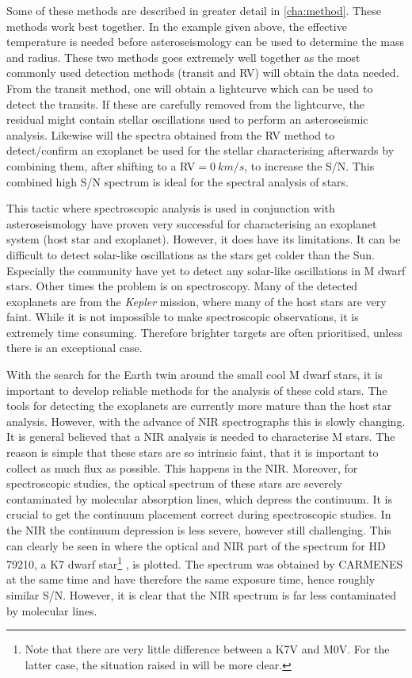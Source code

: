 Some of these methods are described in greater detail in \cref{cha:method}. These methods work best
together. In the example given above, the effective temperature is needed before asteroseismology
can be used to determine the mass and radius. These two methods goes extremely well together as the
most commonly used detection methods (transit and RV) will obtain the data needed. From the transit
method, one will obtain a lightcurve which can be used to detect the transits. If these are
carefully removed from the lightcurve, the residual might contain stellar oscillations used to
perform an asteroseismic analysis. Likewise will the spectra obtained from the RV method to
detect/confirm an exoplanet be used for the stellar characterising afterwards by combining them,
after shifting to a RV$=\SI{0}{km/s}$, to increase the S/N. This combined high S/N spectrum is ideal
for the spectral analysis of stars.

This tactic where spectroscopic analysis is used in conjunction with asteroseismology have proven
very successful \citep[see e.g.][]{Huber2013} for characterising an exoplanet system (host star and
exoplanet). However, it does have its limitations. It can be difficult to detect solar-like
oscillations as the stars get colder than the Sun. Especially the community have yet to detect any
solar-like oscillations in M dwarf stars\citep{Rodriguez2016,Berdinas2017}. Other times the problem
is on spectroscopy. Many of the detected exoplanets are from the \emph{Kepler} mission, where many
of the host stars are very faint. While it is not impossible to make spectroscopic observations, it
is extremely time consuming. Therefore brighter targets are often prioritised, unless there is an
exceptional case.

With the search for the Earth twin around the small cool M dwarf stars, it is important to develop
reliable methods for the analysis of these cold stars. The tools for detecting the exoplanets are
currently more mature than the host star analysis. However, with the advance of NIR spectrographs
this is slowly changing. It is general believed that a NIR analysis is needed to characterise M
stars. The reason is simple that these stars are so intrinsic faint, that it is important to collect
as much flux as possible. This happens in the NIR. Moreover, for spectroscopic studies, the optical
spectrum of these stars are severely contaminated by molecular absorption lines, which depress the
continuum. It is crucial to get the continuum placement correct during spectroscopic studies. In the
NIR the continuum depression is less severe, however still challenging. This can clearly be seen in
 where the optical and NIR part of the spectrum for HD 79210, a K7 dwarf
star\footnote{Note that there are very little difference between a K7V and M0V. For the latter case,
the situation raised in  will be more clear.} \citep{Kirkpatrick1991}, is
plotted. The spectrum was obtained by CARMENES at the same time and have therefore the same exposure
time, hence roughly similar S/N. However, it is clear that the NIR spectrum is far less contaminated
by molecular lines.

